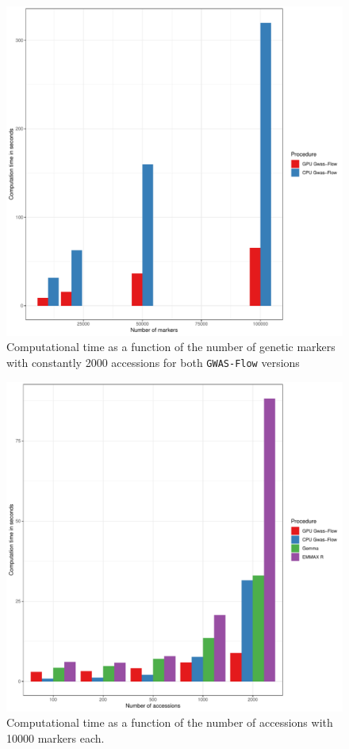 \begin{figure}[th]
\centering
\includegraphics[height=.55\textheight, width=1.1\textwidth]{Figures/time_markers_gwas}
\decoRule
\caption[Computation time vs number of markers]{Computational time as a function of the number of genetic markers with constantly 2000 accessions for both \texttt{GWAS-Flow} versions}
\label{fig:time_marker}
\end{figure}




\begin{figure}[th]
\centering
\includegraphics[height=.55\textheight, width=1.1\textwidth]{Figures/comp_time_gwas}
\decoRule
\caption[Computations time vs accessions]{Computational time as a function of the number of accessions with 10000 markers each.}
\label{fig:time_accessions}
\end{figure}



